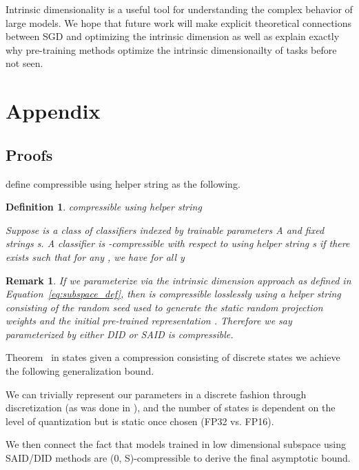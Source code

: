 \documentclass{article} \usepackage{iclr2020_conference,times}
\newtheorem{definition}{Definition}
\newtheorem{remark}{Remark}
\begin{document}
Intrinsic dimensionality is a useful tool for understanding the complex behavior of large models. We hope that future work will make explicit theoretical connections between SGD and optimizing the intrinsic dimension as well as explain exactly why pre-training methods optimize the intrinsic dimensionailty of tasks before not seen.





\appendix
\section{Appendix}
\subsection{Proofs}
\label{sec:proofs}
\cite{compression_generalization_gap} define  compressible using helper string  as the following.
\begin{definition}
 compressible using helper string  

Suppose  is a class of
classifiers indexed by trainable parameters A and fixed strings s. A classifier  is -compressible
with respect to  using helper string s if there exists  such that for any , we have
for all y

\end{definition}
\begin{remark}
If we parameterize  via the intrinsic dimension approach as defined in Equation~\ref{eq:subspace_def}, then  is compressible losslessly using a helper string consisting of the random seed used to generate the static random projection weights and the initial pre-trained representation . Therefore we say  parameterized by either DID or SAID is  compressible.
\end{remark}
Theorem~ in \cite{compression_generalization_gap} states given a compression consisting of  discrete states we achieve the following generalization bound.


We can trivially represent our parameters  in a discrete fashion through discretization (as was done in \cite{compression_generalization_gap}), and the number of states is dependent on the level of quantization but is static once chosen (FP32 vs. FP16).

We then connect the fact that models trained in low dimensional subspace using SAID/DID methods are (0, S)-compressible to derive the final asymptotic bound.
\end{document}
